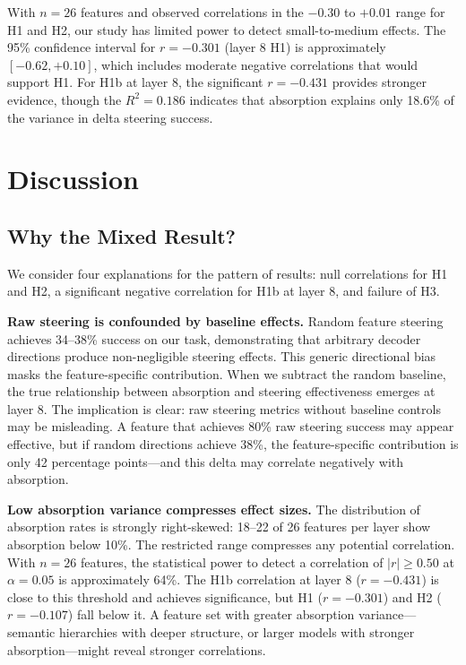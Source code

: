 \documentclass{article}
\begin{document}
With $n = 26$ features and observed correlations in the $-0.30$ to $+0.01$ range for H1 and H2, our study has limited power to detect small-to-medium effects. The 95\% confidence interval for $r = -0.301$ (layer 8 H1) is approximately $[-0.62, +0.10]$, which includes moderate negative correlations that would support H1. For H1b at layer 8, the significant $r = -0.431$ provides stronger evidence, though the $R^2 = 0.186$ indicates that absorption explains only 18.6\% of the variance in delta steering success.

\section{Discussion}
\label{sec:discussion}

\subsection{Why the Mixed Result?}

We consider four explanations for the pattern of results: null correlations for H1 and H2, a significant negative correlation for H1b at layer 8, and failure of H3.

\textbf{Raw steering is confounded by baseline effects.} Random feature steering achieves 34--38\% success on our task, demonstrating that arbitrary decoder directions produce non-negligible steering effects. This generic directional bias masks the feature-specific contribution. When we subtract the random baseline, the true relationship between absorption and steering effectiveness emerges at layer 8. The implication is clear: raw steering metrics without baseline controls may be misleading. A feature that achieves 80\% raw steering success may appear effective, but if random directions achieve 38\%, the feature-specific contribution is only 42 percentage points---and this delta may correlate negatively with absorption.

\textbf{Low absorption variance compresses effect sizes.} The distribution of absorption rates is strongly right-skewed: 18--22 of 26 features per layer show absorption below 10\%. The restricted range compresses any potential correlation. With $n = 26$ features, the statistical power to detect a correlation of $|r| \geq 0.50$ at $\alpha = 0.05$ is approximately 64\%. The H1b correlation at layer 8 ($r = -0.431$) is close to this threshold and achieves significance, but H1 ($r = -0.301$) and H2 ($r = -0.107$) fall below it. A feature set with greater absorption variance---semantic hierarchies with deeper structure, or larger models with stronger absorption---might reveal stronger correlations.
\end{document}
